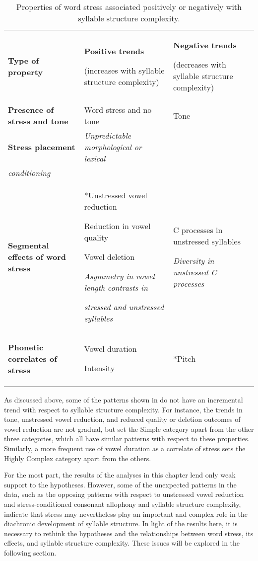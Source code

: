 \begin{table}
\begin{tabularx}{\textwidth}{XXX}
\lsptoprule

\textbf{Type of property} & \textbf{Positive trends}

(increases with syllable structure complexity) & \textbf{Negative trends}

(decreases with syllable structure complexity)\\
\textbf{Presence of stress and tone} & Word stress and no tone & Tone\\
\textbf{Stress placement} & \textit{Unpredictable morphological or lexical}\\
     \textit{conditioning} & \\
\textbf{Segmental effects of word stress} & *Unstressed vowel reduction

Reduction in vowel quality

Vowel deletion

\textit{Asymmetry in vowel length contrasts in} 

     \textit{stressed and unstressed syllables} & C processes in unstressed syllables

\textit{Diversity in unstressed C processes}\\
\textbf{Phonetic correlates of stress} & Vowel duration

Intensity & *Pitch\\
\lspbottomrule
\end{tabularx}
\caption{\label{tab:5.14}Properties of word stress associated positively or negatively with syllable structure complexity.}
\end{table}

  As discussed above, some of the patterns shown in  do not have an incremental trend with respect to syllable structure complexity. For instance, the trends in tone, unstressed vowel reduction, and reduced quality or deletion outcomes of vowel reduction are not gradual, but set the Simple category apart from the other three categories, which all have similar patterns with respect to these properties. Similarly, a more frequent use of vowel duration as a correlate of stress sets the Highly Complex category apart from the others.

  For the most part, the results of the analyses in this chapter lend only weak support to the hypotheses. However, some of the unexpected patterns in the data, such as the opposing patterns with respect to unstressed vowel reduction and stress-conditioned consonant allophony and syllable structure complexity, indicate that stress may nevertheless play an important and complex role in the diachronic development of syllable structure. In light of the results here, it is necessary to rethink the hypotheses and the relationships between word stress, its effects, and syllable structure complexity. These issues will be explored in the following section.

